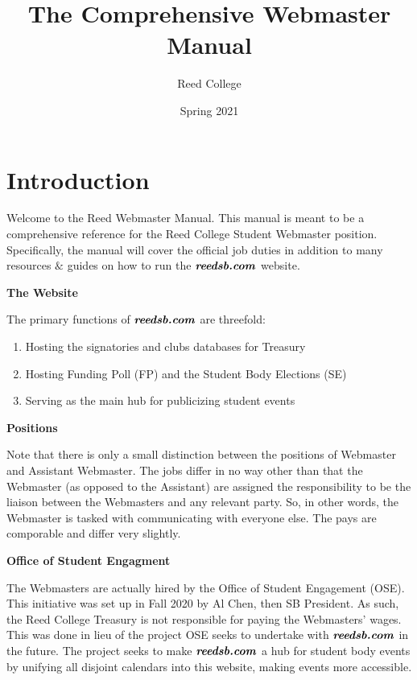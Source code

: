 \documentclass[a4paper]{article}
\title{The Comprehensive Webmaster Manual}
\author{Reed College}
\date{Spring 2021}
\begin{document}
\maketitle


\section{Introduction}

Welcome to the Reed Webmaster Manual. This manual is meant to be a comprehensive reference for the Reed College Student Webmaster position. Specifically, the manual will cover the official job duties in addition to many resources $\&$ guides on how to run the $\textbf{\textit{reedsb.com}}$ website.


\medskip
\begin{center}
\textbf{The Website}
\end{center}

The primary functions of $\textbf{\textit{reedsb.com}}$ are threefold:
\begin{enumerate}
\item Hosting the signatories and clubs databases for Treasury
\item Hosting Funding Poll (FP) and the Student Body Elections (SE)
\item Serving as the main hub for publicizing student events
\end{enumerate}


\medskip
\begin{center}
\textbf{Positions}
\end{center}

Note that there is only a small distinction between the positions of Webmaster and Assistant Webmaster. The jobs differ in no way other than that the Webmaster (as opposed to the Assistant) are assigned the responsibility to be the liaison between the Webmasters and any relevant party. So, in other words, the Webmaster is tasked with communicating with everyone else. The pays are comporable and differ very slightly.


\medskip
\begin{center}
\textbf{Office of Student Engagment}
\end{center}
The Webmasters are actually hired by the Office of Student Engagement (OSE). This initiative was set up in Fall 2020 by Al Chen, then SB President. As such, the Reed College Treasury is not responsible for paying the Webmasters' wages. This was done in lieu of the project OSE seeks to undertake with $\textbf{\textit{reedsb.com}}$ in the future. The project seeks to make $\textbf{\textit{reedsb.com}}$ a hub for student body events by unifying all disjoint calendars into this website, making events more accessible.
\end{document}
